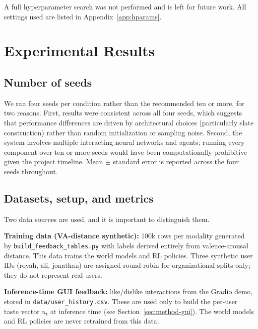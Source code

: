 \documentclass[11pt]{article}
\begin{document}
A full hyperparameter search was not performed and is left for future
work. All settings used are listed in Appendix~\ref{app:hparams}.

\section{Experimental Results}
\label{sec:results}

\subsection{Number of seeds}
\label{sec:results-seeds}

We ran four seeds per condition rather than the recommended ten or more,
for two reasons. First, results were consistent across all four seeds,
which suggests that performance differences are driven by architectural
choices (particularly slate construction) rather than random
initialization or sampling noise. Second, the system involves multiple
interacting neural networks and agents; running every component over ten
or more seeds would have been computationally prohibitive given the
project timeline. Mean $\pm$ standard error is reported across the four
seeds throughout.

\subsection{Datasets, setup, and metrics}
\label{sec:results-setup}

Two data sources are used, and it is important to distinguish them.

\textbf{Training data (VA-distance synthetic):} 100k rows per modality
generated by \texttt{build\_feedback\_tables.py} with labels derived
entirely from valence-arousal distance. This data trains the world
models and RL policies. Three synthetic user IDs (royah, ali, jonathan)
are assigned round-robin for organizational splits only; they do not
represent real users.

\textbf{Inference-time GUI feedback:} like/dislike interactions from the
Gradio demo, stored in \texttt{data/user\_history.csv}. These are used
only to build the per-user taste vector $u_t$ at inference time (see
Section~\ref{sec:method-gui}). The world models and RL policies are
never retrained from this data.
\end{document}
